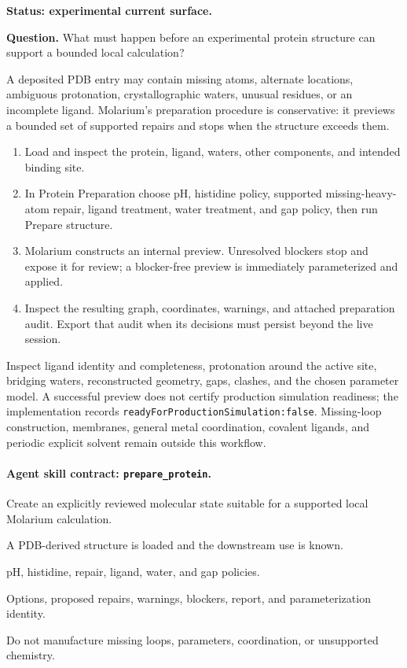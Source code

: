 \begin{small}
\textbf{Status: experimental current surface.}

\textbf{Question.} What must happen before an experimental protein structure can support a bounded local calculation?

A deposited PDB entry may contain missing atoms, alternate locations, ambiguous protonation, crystallographic waters, unusual residues, or an incomplete ligand. Molarium's preparation procedure is conservative: it previews a bounded set of supported repairs and stops when the structure exceeds them.

\begin{enumerate}[leftmargin=*]
\item Load and inspect the protein, ligand, waters, other components, and intended binding site.
\item In Protein Preparation choose pH, histidine policy, supported missing-heavy-atom repair, ligand treatment, water treatment, and gap policy, then run Prepare structure.
\item Molarium constructs an internal preview. Unresolved blockers stop and expose it for review; a blocker-free preview is immediately parameterized and applied.
\item Inspect the resulting graph, coordinates, warnings, and attached preparation audit. Export that audit when its decisions must persist beyond the live session.
\end{enumerate}

Inspect ligand identity and completeness, protonation around the active site, bridging waters, reconstructed geometry, gaps, clashes, and the chosen parameter model. A successful preview does not certify production simulation readiness; the implementation records \texttt{readyForProductionSimulation:false}. Missing-loop construction, membranes, general metal coordination, covalent ligands, and periodic explicit solvent remain outside this workflow.

\paragraph{Agent skill contract: \texttt{prepare\_protein}.}

\begin{description}[leftmargin=2.2cm,style=nextline]
\item[Goal] Create an explicitly reviewed molecular state suitable for a supported local Molarium calculation.
\item[Preconditions] A PDB-derived structure is loaded and the downstream use is known.
\item[Inputs] pH, histidine, repair, ligand, water, and gap policies.
\item[Evidence] Options, proposed repairs, warnings, blockers, report, and parameterization identity.
\item[Stop] Do not manufacture missing loops, parameters, coordination, or unsupported chemistry.
\end{description}


\end{small}
